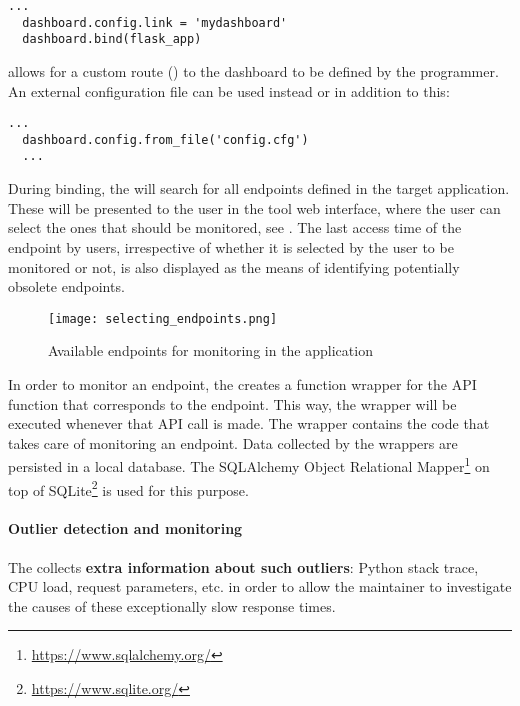 \documentclass{sig-alternate-05-2015}
\begin{document}
  \begin{lstlisting}[style=custompython]
  ...
  dashboard.config.link = 'mydashboard'
  dashboard.bind(flask_app)
  \end{lstlisting}
  
  allows for a custom route () to the dashboard to be defined by the programmer. An external configuration file can be used instead or in addition to this:
  
  \begin{lstlisting}[style=custompython]
  ...
  dashboard.config.from_file('config.cfg')
  ...
  \end{lstlisting}

  During binding, the \tool will search for all endpoints defined in the target application. These will be presented to the user in the tool web interface, where the user can select the ones that should be monitored, see . The last access time of the endpoint by users, irrespective of whether it is selected by the user to be monitored or not, is also displayed as the means of identifying potentially obsolete endpoints.

    \begin{figure}
      \centering
      \texttt{[image: selecting\_endpoints.png]}
      \caption{Available endpoints for monitoring in the \zee application}
      \label{fig:sep}
    \end{figure}

  In order to monitor an endpoint, the \tool creates a function wrapper for the API function that corresponds to the endpoint. This way, the wrapper will be executed whenever that API call is made. The wrapper contains the code that takes care of monitoring an endpoint. Data collected by the wrappers are persisted in a local database. The SQLAlchemy Object Relational Mapper\footnote{\url{https://www.sqlalchemy.org/}} on top of SQLite\footnote{\url{https://www.sqlite.org/}} is used for this purpose.
  
  \paragraph{Outlier detection and monitoring}
  
  
  The \tool collects {\bf extra information about such outliers}: Python stack trace, CPU load, request parameters, etc. in order to allow the maintainer to investigate the causes of these exceptionally slow response times. 
  
\end{document}
